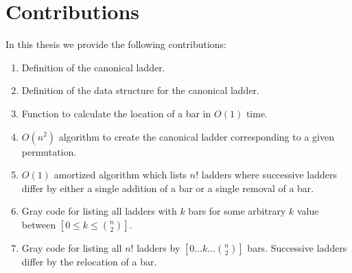 
	

	

\section{Contributions}
In this thesis we provide the following contributions:
	\begin{enumerate}
    \item Definition of the canonical ladder.
    \item Definition of the data structure for the canonical ladder. 
    \item Function to calculate the location of a bar 
   in $O(1)$ time.
    \item $O(n^2)$ algorithm to create the canonical ladder corresponding to a given permutation.
    \item $O(1)$ amortized algorithm which lists $n!$ ladders where successive ladders differ by either a single  addition of a bar or a single removal of a bar.
    \item Gray code for listing all ladders with $k$ bars for some arbitrary $k$ value between $[0 \leq k \leq {n \choose 2}]$. 
    \item Gray code for listing all $n!$ ladders by $[0 \dots k \dots {n \choose 2}]$ bars. Successive ladders differ by the relocation of a bar.
\end{enumerate}
	

